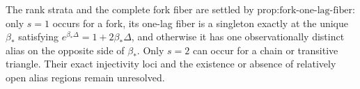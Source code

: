 The rank strata and the complete fork fiber are settled by \(\text{prop:fork-one-lag-fiber}\): only \(s=1\) occurs for a fork, its one-lag fiber is a singleton exactly at the unique \(\beta_*\) satisfying \(e^{\beta_*\Delta}=1+2\beta_*\Delta\), and otherwise it has one observationally distinct alias on the opposite side of \(\beta_*\).  Only \(s=2\) can occur for a chain or transitive triangle.  Their exact injectivity loci and the existence or absence of relatively open alias regions remain unresolved.